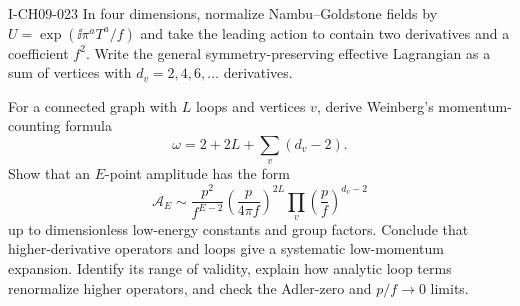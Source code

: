\begin{exercise}{I-CH09-023}
In four dimensions, normalize Nambu--Goldstone fields by
$U=\exp(\ii\pi^aT^a/f)$ and take the leading action to contain two
derivatives and a coefficient $f^2$.  Write the general symmetry-preserving
effective Lagrangian as a sum of vertices with $d_v=2,4,6,\ldots$ derivatives.

For a connected graph with $L$ loops and vertices $v$, derive Weinberg's
momentum-counting formula
\[
  \omega=2+2L+\sum_v(d_v-2).
\]
Show that an $E$-point amplitude has the form
\[
  \mathcal A_E\sim\frac{p^2}{f^{E-2}}
  \left(\frac{p}{4\pi f}\right)^{2L}
  \prod_v\left(\frac{p}{f}\right)^{d_v-2}
\]
up to dimensionless low-energy constants and group factors.  Conclude that
higher-derivative operators and loops give a systematic low-momentum
expansion.  Identify its range of validity, explain how analytic loop terms
renormalize higher operators, and check the Adler-zero and $p/f\to0$ limits.
\end{exercise}
